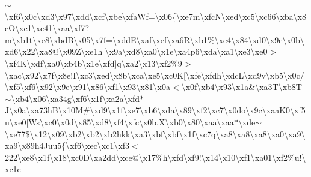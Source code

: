 \begin{DoxyCompactItemize}
$\sim$\textbackslash{}xf6\textbackslash{}x0c\textbackslash{}xd3\textbackslash{}x97\textbackslash{}xdd\textbackslash{}xcf\textbackslash{}xbe\textbackslash{}xfa\+Wf=\textbackslash{}x06\{\textbackslash{}xe7m\textbackslash{}xfc\+N\textbackslash{}xed\textbackslash{}xc5\textbackslash{}xc66\textbackslash{}xba\textbackslash{}x8c\+O\textbackslash{}xc1\textbackslash{}xc41\textbackslash{}xaa\textbackslash{}xf7?m\textbackslash{}xb1t\textbackslash{}xe8\textbackslash{}xbd\+B\textbackslash{}x05\textbackslash{}x7f=\textbackslash{}xdd\+E\textbackslash{}xaf\textbackslash{}xef\textbackslash{}xa6\+R\textbackslash{}xb1\%\textbackslash{}xe4\textbackslash{}x84\textbackslash{}xd0\textbackslash{}x9e\textbackslash{}x0b\textbackslash{}xd6\textbackslash{}x22\textbackslash{}xa8@\textbackslash{}x09\+Z\textbackslash{}xe1h\textquotesingle{} \textbackslash{}x9a\textbackslash{}xd8\textbackslash{}xa0\textbackslash{}x1e\textbackslash{}xa4p6\textbackslash{}xda\textbackslash{}xa1\textbackslash{}xe3\textbackslash{}xe0$>$\textbackslash{}xf4\+K\textbackslash{}xdf\textbackslash{}xa0\textbackslash{}xb4b\textbackslash{}x1e\textbackslash{}xfd\mbox{]}q\textbackslash{}xa2\textbackslash{}x13\textbackslash{}xf2\%9$>$\textbackslash{}xac\textbackslash{}x92\textbackslash{}x7f\textbackslash{}x8e!\+I\textbackslash{}xc3\textbackslash{}xed\textbackslash{}x8b\textbackslash{}xca\textbackslash{}xe5\textbackslash{}xc0\+K\mbox{[}\textbackslash{}xfe\textbackslash{}xfdh\textbackslash{}xdc\+L\textbackslash{}xd9v\textbackslash{}xb5\textbackslash{}x0c/\textbackslash{}xf5\textbackslash{}xf6\textbackslash{}x92\textbackslash{}x9e\textbackslash{}x91\textbackslash{}x86\textbackslash{}xf1\textbackslash{}x93\textbackslash{}x81\textbackslash{}x0a$<$\textbackslash{}x0f\textbackslash{}xb4\textbackslash{}x93\textbackslash{}x1a\&\textbackslash{}xa3\+T\textbackslash{}xb8\+T$\sim$\textbackslash{}xb4\textbackslash{}x06\textbackslash{}xa34g\textbackslash{}xf6\textbackslash{}x1f\textbackslash{}xa2a\textbackslash{}xfd$\ast$\+J\textbackslash{}x0a\textbackslash{}xa73h\+B\textbackslash{}x10\+M\#\textbackslash{}xd9\textbackslash{}x1f\textbackslash{}xe7\textbackslash{}xb6\textbackslash{}xda\textbackslash{}x89\textbackslash{}xf2\textbackslash{}xc7\textbackslash{}x0do\textbackslash{}x9c\textbackslash{}xaa\+K0\textbackslash{}xf5u\textbackslash{}xe0\mbox{[}\+Ws\textbackslash{}xc0\textbackslash{}x0d\textbackslash{}x85\textbackslash{}xd8\textbackslash{}xf4\textbackslash{}xfc\textbackslash{}x0b,\+X\textbackslash{}xb0\textbackslash{}x80\textbackslash{}xaa\textbackslash{}xaa$\ast$\textbackslash{}xde$\sim$\textbackslash{}xe77\$\textbackslash{}x12\textbackslash{}x09\textbackslash{}xb2\textbackslash{}xb2\textbackslash{}xb2hkk\textbackslash{}xa3\textbackslash{}xbf\textbackslash{}xbf\textbackslash{}x1f\textbackslash{}xc7q\textbackslash{}xa8\textbackslash{}xa8\textbackslash{}xa8\textbackslash{}xa0\textbackslash{}xa9\textbackslash{}xa9\textbackslash{}x89h4\+Juu5\{\textbackslash{}xf6\textbackslash{}xec\textbackslash{}xc1\textbackslash{}xf3$<$222\textbackslash{}xe8\textbackslash{}x1f\textbackslash{}x18\textbackslash{}xc0\+D\textbackslash{}xa2dd\textbackslash{}xce@\textbackslash{}x17\%h\textbackslash{}xfd\textbackslash{}xf9!\textbackslash{}x14\textbackslash{}x10\textbackslash{}xf1\textbackslash{}xa01\textbackslash{}xf2\%u!\textbackslash{}xc1c\textbackslas
\end{DoxyCompactItemize}
